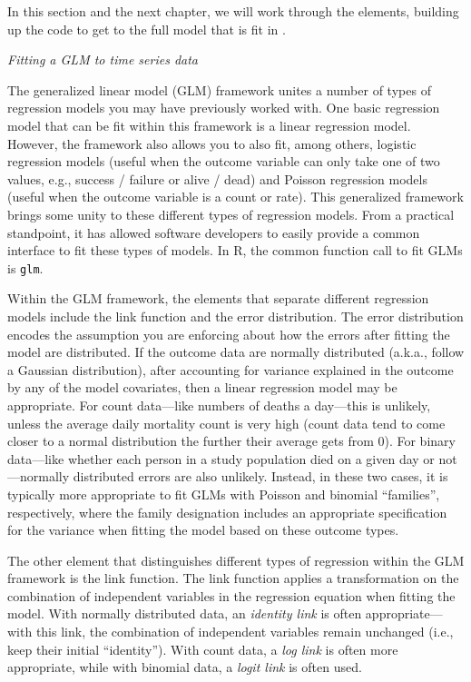 \documentclass[
]{book}
\begin{document}
In this section and the next chapter, we will work through the elements,
building up the code to get to the full model that is fit in \citet{vicedo2019hands}.

\emph{Fitting a GLM to time series data}

The generalized linear model (GLM) framework unites a number of types of
regression models you may have previously worked with. One basic regression
model that can be fit within this framework is a linear regression model.
However, the framework also allows you to also fit, among others, logistic
regression models (useful when the outcome variable can only take one of two
values, e.g., success / failure or alive / dead) and Poisson regression models
(useful when the outcome variable is a count or rate). This generalized
framework brings some unity to these different types of regression models. From
a practical standpoint, it has allowed software developers to easily provide a
common interface to fit these types of models. In R, the common function call to
fit GLMs is \texttt{glm}.

Within the GLM framework, the elements that separate different regression models
include the link function and the error distribution. The error distribution
encodes the assumption you are enforcing about how the errors after fitting the
model are distributed. If the outcome data are normally distributed (a.k.a.,
follow a Gaussian distribution), after accounting for variance explained in the
outcome by any of the model covariates, then a linear regression model may be
appropriate. For count data---like numbers of deaths a day---this is unlikely,
unless the average daily mortality count is very high (count data tend to
come closer to a normal distribution the further their average gets from
0). For binary data---like whether each person in a study population died on
a given day or not---normally distributed errors are also unlikely. Instead,
in these two cases, it is typically more appropriate to fit GLMs with
Poisson and binomial ``families'', respectively, where the family designation
includes an appropriate specification for the variance when fitting the model
based on these outcome types.

The other element that distinguishes different types of regression within
the GLM framework is the link function. The link function applies a transformation
on the combination of independent variables in the regression equation
when fitting the model. With normally distributed data, an \emph{identity link}
is often appropriate---with this link, the combination of independent variables
remain unchanged (i.e., keep their initial ``identity''). With count data, a
\emph{log link} is often more appropriate, while with binomial data, a \emph{logit link}
is often used.
\end{document}
